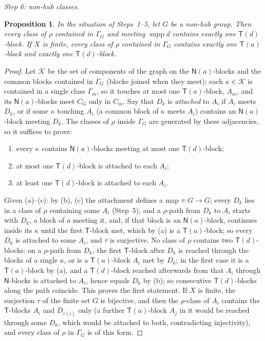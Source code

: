 \documentclass[11pt]{amsart}
\newtheorem{proposition}[theorem]{Proposition}
\theoremstyle{definition}
\newcommand{\supp}{\operatorname{supp}}
\newcommand{\T}{\mathsf{T}}
\newcommand{\N}{\mathsf{N}}
\begin{document}
\smallskip
\emph{Step 6: non-hub classes.}

\begin{proposition}\label{prop:Qnh}
In the situation of Steps~\textup{1--5}, let $G$ be a non-hub group. Then every class of $\rho$ contained in $\Gamma_G$ and meeting $\supp d$ contains exactly one $\T(d)$-block. If $X$ is finite, every class of $\rho$ contained in $\Gamma_G$ contains exactly one $\T(a)$-block and exactly one $\T(d)$-block.
\end{proposition}

\begin{proof}
Let $\mathcal K$ be the set of components of the graph on the $\N(a)$-blocks and the common blocks contained in $\Gamma_G$ (blocks joined when they meet); each $\kappa\in\mathcal K$ is contained in a single class $\Gamma_m$, so it touches at most one $\T(a)$-block, $A_m$, and its $\N(a)$-blocks meet $C_G$ only in $C_m$. Say that $D_k$ is \emph{attached} to $A_i$ if $A_i$ meets $D_k$, or if some $\kappa$ touching $A_i$ (a common block of $\kappa$ meets $A_i$) contains an $\N(a)$-block meeting $D_k$. The classes of $\rho$ inside $\Gamma_G$ are generated by these adjacencies, so it suffices to prove:
\begin{enumerate}[nosep,label=(\alph*)]
\item every $\kappa$ contains $\N(a)$-blocks meeting at most one $\T(d)$-block;
\item at most one $\T(d)$-block is attached to each $A_i$;
\item at least one $\T(d)$-block is attached to each $A_i$.
\end{enumerate}
Given (a)--(c): by (b), (c) the attachment defines a map $\tau\colon G\to G$; every $D_k$ lies in a class of $\rho$ containing some $A_i$ (Step~5), and a $\rho$-path from $D_k$ to $A_i$ starts with $D_k$, a block of $a$ meeting it, and, if that block is an $\N(a)$-block, continues inside its $\kappa$ until the first $\T$-block met, which by (a) is a $\T(a)$-block; so every $D_k$ is attached to some $A_i$, and $\tau$ is surjective. No class of $\rho$ contains two $\T(d)$-blocks: on a $\rho$-path from $D_k$, the first $\T$-block after $D_k$ is reached through the blocks of a single $\kappa$, or is a $\T(a)$-block $A_i$ met by $D_k$; in the first case it is a $\T(a)$-block by (a), and a $\T(d)$-block reached afterwards from that $A_i$ through $\N$-blocks is attached to $A_i$, hence equals $D_k$ by (b); so consecutive $\T(d)$-blocks along the path coincide. This proves the first statement. If $X$ is finite, the surjection $\tau$ of the finite set $G$ is bijective, and then the $\rho$-class of $A_i$ contains the $\T$-blocks $A_i$ and $D_{\tau(i)}$ only (a further $\T(a)$-block $A_j$ in it would be reached through some $D_k$, which would be attached to both, contradicting injectivity), and every class of $\rho$ in $\Gamma_G$ is of this form.


\end{proof}
\end{document}
